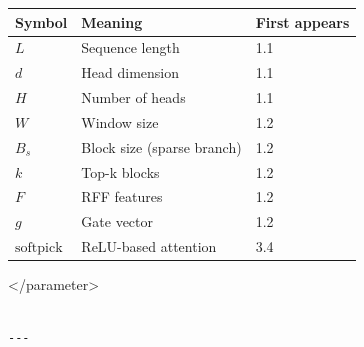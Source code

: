 \begin{table}[H]
\centering
\small
\begin{tabular}{lll}
\toprule
\textbf{Symbol} & \textbf{Meaning} & \textbf{First appears} \\
\midrule
$L$ & Sequence length & 1.1 \\
$d$ & Head dimension & 1.1 \\
$H$ & Number of heads & 1.1 \\
$W$ & Window size & 1.2 \\
$B_s$ & Block size (sparse branch) & 1.2 \\
$k$ & Top-k blocks & 1.2 \\
$F$ & RFF features & 1.2 \\
$g$ & Gate vector & 1.2 \\
$\text{softpick}$ & ReLU-based attention & 3.4 \\
\bottomrule
\end{tabular}
\end{table}
</parameter>
\begin{lstlisting}

---
\end{lstlisting}